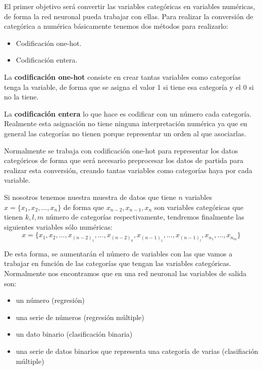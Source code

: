 \documentclass[
  a4paper,
  DIV=11,
  numbers=noendperiod]{scrreprt}
\providecommand{\tightlist}{%
  \setlength{\itemsep}{0pt}\setlength{\parskip}{0pt}}\usepackage{longtable,booktabs,array}
\begin{document}
El primer objetivo será convertir las variables categóricas en variables
numéricas, de forma la red neuronal pueda trabajar con ellas. Para
realizar la conversión de categórica a numérica básicamente tenemos dos
métodos para realizarlo:

\begin{itemize}
\item
  Codificación one-hot.
\item
  Codificación entera.
\end{itemize}

La \textbf{codificación one-hot} consiste en crear tantas variables como
categorías tenga la variable, de forma que se asigna el valor 1 si tiene
esa categoría y el 0 si no la tiene.

La \textbf{codificación entera} lo que hace es codificar con un número
cada categoría. Realmente esta asignación no tiene ninguna
interpretación numérica ya que en general las categorías no tienen
porque representar un orden al que asociarlas.

Normalmente se trabaja con codificación one-hot para representar los
datos categóricos de forma que será necesario preprocesar los datos de
partida para realizar esta conversión, creando tantas variables como
categorías haya por cada variable.

Si nosotros tenemos nuestra muestra de datos que tiene \(n\) variables
\(x=\{x_1,x_2,...,x_n\}\) de forma que \(x_{n-2},x_{n-1},x_n\) son
variables categóricas que tienen \(k,l,m\) número de categorías
respectivamente, tendremos finalmente las siguientes variables sólo
numéricas:
\[ x=\{x_1,x_2,...,x_{(n-2)_1},...,x_{(n-2)_k},x_{(n-1)_1},...,x_{(n-1)_l},x_{n_1},...,x_{n_m}\} \]

De esta forma, se aumentarán el número de variables con las que vamos a
trabajar en función de las categorías que tengan las variables
categóricas. Normalmente nos encontramos que en una red neuronal las
variables de salida son:

\begin{itemize}
\tightlist
\item
  un número (regresión)
\item
  una serie de números (regresión múltiple)
\item
  un dato binario (clasificación binaria)
\item
  una serie de datos binarios que representa una categoría de varias
  (clasifiación múltiple)
\end{itemize}
\end{document}
